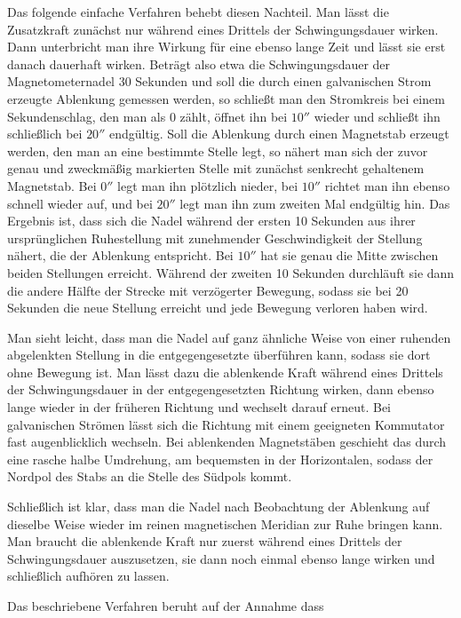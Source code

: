 Das folgende einfache Verfahren behebt diesen Nachteil. Man lässt die Zusatzkraft zunächst nur während eines Drittels der Schwingungsdauer wirken. Dann unterbricht man ihre Wirkung für eine ebenso lange Zeit und lässt sie erst danach dauerhaft wirken. Beträgt also etwa die Schwingungsdauer der Magnetometernadel 30 Sekunden und soll die durch einen galvanischen Strom erzeugte Ablenkung gemessen werden, so schließt man den Stromkreis bei einem Sekundenschlag, den man als 0 zählt, öffnet ihn bei $10''$ wieder und schließt ihn schließlich bei $20''$ endgültig. Soll die Ablenkung durch einen Magnetstab erzeugt werden, den man an eine bestimmte Stelle legt, so nähert man sich der zuvor genau und zweckmäßig markierten Stelle mit zunächst senkrecht gehaltenem Magnetstab. Bei $0''$ legt man ihn plötzlich nieder, bei $10''$ richtet man ihn ebenso schnell wieder auf, und bei $20''$ legt man ihn zum zweiten Mal endgültig hin. Das Ergebnis ist, dass sich die Nadel während der ersten 10 Sekunden aus ihrer ursprünglichen Ruhestellung mit zunehmender Geschwindigkeit der Stellung nähert, die der Ablenkung entspricht. Bei $10''$ hat sie genau die Mitte zwischen beiden Stellungen erreicht. Während der zweiten 10 Sekunden durchläuft sie dann die andere Hälfte der Strecke mit verzögerter Bewegung, sodass sie bei 20 Sekunden die neue Stellung erreicht und jede Bewegung verloren haben wird.

Man sieht leicht, dass man die Nadel auf ganz ähnliche Weise von einer ruhenden abgelenkten Stellung in die entgegengesetzte überführen kann, sodass sie dort ohne Bewegung ist. Man lässt dazu die ablenkende Kraft während eines Drittels der Schwingungsdauer in der entgegengesetzten Richtung wirken, dann ebenso lange wieder in der früheren Richtung und wechselt darauf erneut. Bei galvanischen Strömen lässt sich die Richtung mit einem geeigneten Kommutator fast augenblicklich wechseln. Bei ablenkenden Magnetstäben geschieht das durch eine rasche halbe Umdrehung, am bequemsten in der Horizontalen, sodass der Nordpol des Stabs an die Stelle des Südpols kommt.

Schließlich ist klar, dass man die Nadel nach Beobachtung der Ablenkung auf dieselbe Weise wieder im reinen magnetischen Meridian zur Ruhe bringen kann. Man braucht die ablenkende Kraft nur zuerst während eines Drittels der Schwingungsdauer auszusetzen, sie dann noch einmal ebenso lange wirken und schließlich aufhören zu lassen.

Das beschriebene Verfahren beruht auf der Annahme dass

